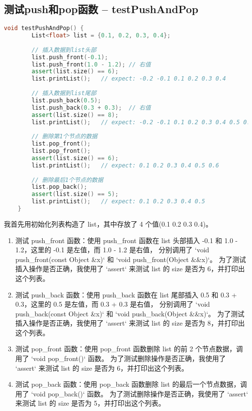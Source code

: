 \documentclass[UTF8]{ctexart}
\begin{document}
\subsection{测试push和pop函数 -- testPushAndPop}
\begin{lstlisting}[language=c++, breaklines=true, keywordstyle=\color{blue!70}, commentstyle=\color{red!50!green!50!blue!50}, frame=shadowbox, rulesepcolor=\color{red!20!green!20!blue!20}]
    void testPushAndPop() {
        List<float> list = {0.1, 0.2, 0.3, 0.4};
    
        // 插入数据到list头部
        list.push_front(-0.1);
        list.push_front(1.0 - 1.2); // 右值
        assert(list.size() == 6);
        list.printList();   // expect: -0.2 -0.1 0.1 0.2 0.3 0.4
    
        // 插入数据到list尾部
        list.push_back(0.5);
        list.push_back(0.3 + 0.3);  // 右值
        assert(list.size() == 8);
        list.printList();   // expect: -0.2 -0.1 0.1 0.2 0.3 0.4 0.5 0.6
    
        // 删除第1个节点的数据
        list.pop_front();
        list.pop_front();
        assert(list.size() == 6);
        list.printList();   // expect: 0.1 0.2 0.3 0.4 0.5 0.6
    
        // 删除最后1个节点的数据
        list.pop_back();
        assert(list.size() == 5);
        list.printList();   // expect: 0.1 0.2 0.3 0.4 0.5
    }
\end{lstlisting}

我首先用初始化列表构造了 list，其中存放了 4 个值(0.1 0.2 0.3 0.4)。

\begin{enumerate}
    \item 测试 push\_front 函数：使用 push\_front 函数在 list 头部插入 -0.1 和 1.0 - 1.2，这里的 -0.1 是左值，而 1.0 - 1.2 是右值，
分别调用了 `void push\_front(const Object \&x)` 和 `void push\_front(Object \&\&x)`。
为了测试插入操作是否正确，我使用了 `assert` 来测试 list 的 size 是否为 6，并打印出这个列表。

    \item 测试 push\_back 函数：使用 push\_back 函数在 list 尾部插入 0.5 和 0.3 + 0.3，这里的 0.5 是左值，而 0.3 + 0.3 是右值，
分别调用了 `void push\_back(const Object \&x)` 和 `void push\_back(Object \&\&x)`。
为了测试插入操作是否正确，我使用了 `assert` 来测试 list 的 size 是否为 8，并打印出这个列表。

    \item 测试 pop\_front 函数：使用 pop\_front 函数删除 list 的前 2 个节点数据，调用了 `void pop\_front()` 函数。
为了测试删除操作是否正确，我使用了 `assert` 来测试 list 的 size 是否为 6，并打印出这个列表。

    \item 测试 pop\_back 函数：使用 pop\_back 函数删除 list 的最后一个节点数据，调用了 `void pop\_back()` 函数。
为了测试删除操作是否正确，我使用了 `assert` 来测试 list 的 size 是否为 5，并打印出这个列表。
\end{enumerate}
\end{document}
